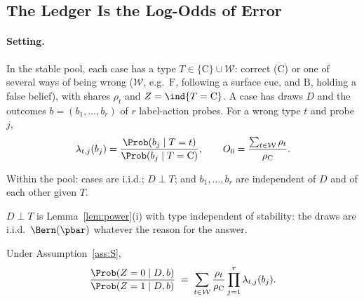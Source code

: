 
\subsection{The Ledger Is the Log-Odds of Error}
\label{sec:method:odds}

\paragraph{Setting.}
In the stable pool, each case has a type $T \in \{\mathrm{C}\} \cup \mathcal{W}$:
correct ($\mathrm{C}$) or one of several ways of being wrong ($\mathcal{W}$, e.g.\
$\mathrm{F}$, following a surface cue, and $\mathrm{B}$, holding a false belief), with
shares $\rho_t$ and $Z = \ind\{T = \mathrm{C}\}$. A case has draws $D$ and the outcomes
$b = (b_1, \dots, b_r)$ of $r$ label-action probes. For a wrong type $t$ and probe $j$,
\[
  \lambda_{t,j}(b_j) = \frac{\Prob(b_j \mid T = t)}{\Prob(b_j \mid T = \mathrm{C})},
  \qquad
  O_0 = \frac{\sum_{t \in \mathcal{W}} \rho_t}{\rho_{\mathrm C}}.
\]

\begin{assumption}[S]
\label{ass:S}
Within the pool: cases are i.i.d.; $D \perp T$; and $b_1, \dots, b_r$ are independent
of $D$ and of each other given $T$.
\end{assumption}

$D \perp T$ is Lemma~\ref{lem:power}(i) with type independent of stability: the draws
are i.i.d.\ $\Bern(\pbar)$ whatever the reason for the answer.

\begin{theorem}
\label{thm:odds}
Under Assumption~\ref{ass:S},
\begin{equation}
  \frac{\Prob(Z = 0 \mid D, b)}{\Prob(Z = 1 \mid D, b)}
  \;=\; \sum_{t \in \mathcal{W}} \frac{\rho_t}{\rho_{\mathrm C}}
        \prod_{j=1}^{r} \lambda_{t,j}(b_j).
  \label{eq:odds}
\end{equation}
\end{theorem}

